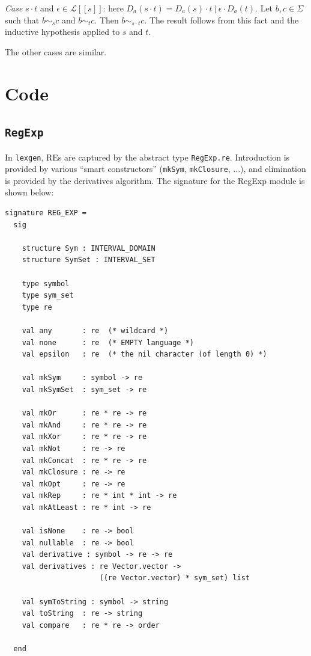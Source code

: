\documentclass[11pt]{article}
\newcommand{\flex}{\texttt{lexgen}}
\newcommand{\OR}{\ | \ }
\newcommand{\CL}{\mathcal{L}}
\newcommand{\Sem}[1]{[ \! [ #1 ] \! ]}
\newcommand{\Ls}[1]{\CL\Sem{#1}}
\newcommand{\nm}[1]{\texttt{#1}}
\begin{document}
\vskip 5pt
\emph{Case} $s \cdot t$ and $\epsilon \in \Ls{s}$: here $D_a(s \cdot t) = D_a(s) \cdot t \OR \epsilon \cdot D_a(t)$.  Let $b, c \in \Sigma$ such that $b \sim_s c$ and $b \sim_t c$.  Then $b \sim_{s \cdot t} c$.  The result follows from this fact and the inductive hypothesis applied to $s$ and $t$.

\vskip 5pt
The other cases are similar.

\newpage
\section{Code}\label{sec:code}

\subsection{\nm{RegExp}}\label{sec:reg-exp}

In \flex{}, REs are captured by the abstract type \nm{RegExp.re}.  Introduction
is provided by various ``smart constructors'' (\nm{mkSym}, \nm{mkClosure},
$\dots$), and elimination is provided by the derivatives algorithm.  The
signature for the \rm{RegExp} module is shown below:

\begin{verbatim}
signature REG_EXP =
  sig

    structure Sym : INTERVAL_DOMAIN
    structure SymSet : INTERVAL_SET

    type symbol
    type sym_set
    type re

    val any       : re  (* wildcard *)
    val none      : re  (* EMPTY language *)
    val epsilon   : re  (* the nil character (of length 0) *)

    val mkSym     : symbol -> re
    val mkSymSet  : sym_set -> re

    val mkOr      : re * re -> re
    val mkAnd     : re * re -> re
    val mkXor     : re * re -> re
    val mkNot     : re -> re
    val mkConcat  : re * re -> re
    val mkClosure : re -> re
    val mkOpt     : re -> re
    val mkRep     : re * int * int -> re
    val mkAtLeast : re * int -> re

    val isNone    : re -> bool
    val nullable  : re -> bool
    val derivative : symbol -> re -> re
    val derivatives : re Vector.vector ->
                      ((re Vector.vector) * sym_set) list

    val symToString : symbol -> string
    val toString  : re -> string
    val compare   : re * re -> order

  end
\end{verbatim}
\end{document}
